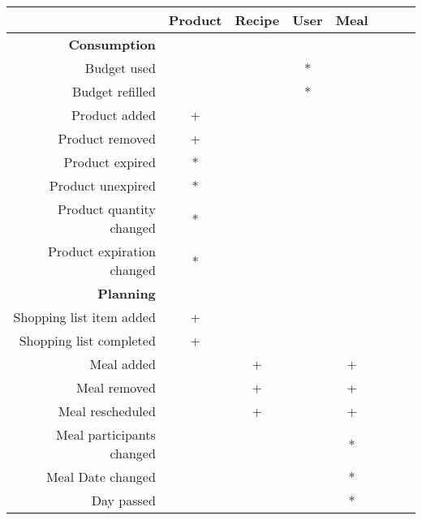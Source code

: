 \begin{table}
    \begin{tabular}{|r|c|c|c|c|c|c|}
        \hline
        ~                                      & Product & Recipe & User & Meal & ~ & ~ \\ \hline
        \textbf{Consumption}                   & ~       & ~      & ~    & ~    & ~ & ~ \\ 
        Budget used                            & ~       & ~      & *    & ~    & ~ & ~ \\ 
        Budget refilled                        & ~       & ~      & *    & ~    & ~ & ~ \\ 
        Product added                          & +       & ~      & ~    & ~    & ~ & ~ \\ 
        Product removed                        & +       & ~      & ~    & ~    & ~ & ~ \\ 
        Product expired                        & *       & ~      & ~    & ~    & ~ & ~ \\ 
        Product unexpired                      & *       & ~      & ~    & ~    & ~ & ~ \\ 
        Product quantity changed               & *       & ~      & ~    & ~    & ~ & ~ \\ 
        Product expiration changed             & *       & ~      & ~    & ~    & ~ & ~ \\ 
        \textbf{Planning}                      & ~       & ~      & ~    & ~    & ~ & ~ \\ 
        Shopping list item added               & +       & ~      & ~    & ~    & ~ & ~ \\ 
        Shopping list completed                & +       & ~      & ~    & ~    & ~ & ~ \\ 
        Meal added                             & ~       & +      & ~    & +    & ~ & ~ \\ 
        Meal removed                           & ~       & +      & ~    & +    & ~ & ~ \\ 
        Meal rescheduled                       & ~       & +      & ~    & +    & ~ & ~ \\ 
        Meal participants changed              & ~       & ~      & ~    & *    & ~ & ~ \\ 
        Meal Date changed                      & ~       & ~      & ~    & *    & ~ & ~ \\ 
        Day passed                             & ~       & ~      & ~    & *    & ~ & ~ \\ 

\end{tabular}
\end{table}
